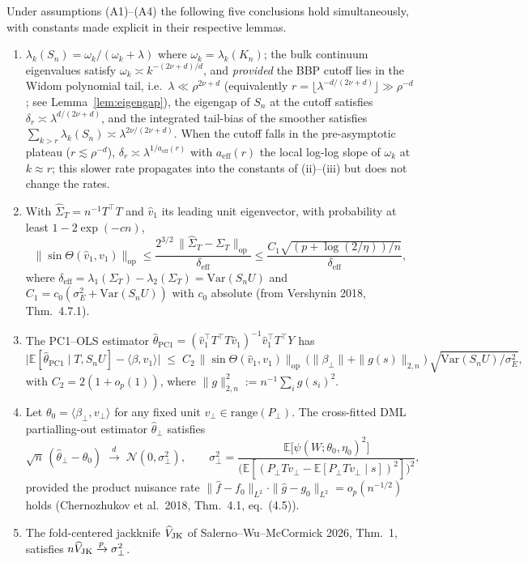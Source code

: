 \medskip
\begin{theorem}\label{thm:main}
Under assumptions (A1)--(A4) the following five conclusions hold simultaneously,
with constants made explicit in their respective lemmas.
\begin{enumerate}
\item[\emph{(i)}] $\lambda_k(S_n)=\omega_k/(\omega_k+\lambda)$ where
   $\omega_k=\lambda_k(K_n)$; the bulk continuum eigenvalues satisfy
   $\omega_k\asymp k^{-(2\nu+d)/d}$, and \emph{provided} the BBP cutoff lies
   in the Widom polynomial tail, i.e.\ $\lambda\ll\rho^{2\nu+d}$ (equivalently
   $r=\lfloor\lambda^{-d/(2\nu+d)}\rfloor\gg\rho^{-d}$; see Lemma~\ref{lem:eigengap}),
   the eigengap of $S_n$ at the cutoff satisfies
   $\delta_r\asymp\lambda^{d/(2\nu+d)}$, and the integrated tail-bias of the
   smoother satisfies $\sum_{k>r}\lambda_k(S_n)\asymp\lambda^{2\nu/(2\nu+d)}$.
   When the cutoff falls in the pre-asymptotic plateau ($r\lesssim\rho^{-d}$),
   $\delta_r\asymp\lambda^{1/a_{\mathrm{eff}}(r)}$ with $a_{\mathrm{eff}}(r)$
   the local log-log slope of $\omega_k$ at $k\!\approx\!r$; this slower rate
   propagates into the constants of (ii)--(iii) but does not change the rates.
\item[\emph{(ii)}] With $\widehat\Sigma_T=n^{-1}T^\top T$ and $\widehat v_1$ its
   leading unit eigenvector, with probability at least $1-2\exp(-cn)$,
\[
\|\sin\Theta(\widehat v_1,v_1)\|_{\mathrm{op}}
   \le \frac{2^{3/2}\,\|\widehat\Sigma_T-\Sigma_T\|_{\mathrm{op}}}{\delta_{\mathrm{eff}}}
   \le \frac{C_1\sqrt{(p+\log(2/\eta))/n}}{\delta_{\mathrm{eff}}},
\]
where $\delta_{\mathrm{eff}}=\lambda_1(\Sigma_T)-\lambda_2(\Sigma_T)=
\mathrm{Var}(S_n U)$ and $C_1=c_0(\sigma_E^2+\mathrm{Var}(S_n U))$ with $c_0$
absolute (from Vershynin 2018, Thm.~4.7.1).
\item[\emph{(iii)}] The PC1--OLS estimator $\widehat\theta_{\mathrm{PC1}}=
   (\widehat v_1^\top T^\top T\widehat v_1)^{-1}\widehat v_1^\top T^\top Y$ has
\[
\bigl|\mathbb{E}[\widehat\theta_{\mathrm{PC1}}\mid T,S_nU]-\langle\beta,v_1\rangle\bigr|
   \;\le\; C_2\,\|\sin\Theta(\widehat v_1,v_1)\|_{\mathrm{op}}\,
   \bigl(\|\beta_\perp\|+\|g(s)\|_{2,n}\bigr)\,
   \sqrt{\mathrm{Var}(S_nU)/\sigma_E^2},
\]
with $C_2=2(1+o_p(1))$, where $\|g\|_{2,n}^2:=n^{-1}\sum_i g(s_i)^2$.
\item[\emph{(iv)}] Let $\theta_0=\langle\beta_\perp,v_\perp\rangle$ for any fixed
   unit $v_\perp\in\mathrm{range}(P_\perp)$. The cross-fitted DML partialling-out
   estimator $\widehat\theta_\perp$ satisfies
\[
\sqrt n\,(\widehat\theta_\perp-\theta_0)\;\xrightarrow{d}\;\mathcal N(0,\sigma_\perp^2),
\qquad
\sigma_\perp^2 = \frac{\mathbb{E}\bigl[\psi(W;\theta_0,\eta_0)^2\bigr]}
                {\bigl(\mathbb{E}[(P_\perp T v_\perp-\mathbb E[P_\perp T v_\perp\mid s])^2]\bigr)^{2}},
\]
provided the product nuisance rate $\|\widehat f-f_0\|_{L^2}\cdot\|\widehat g-g_0\|_{L^2}=o_p(n^{-1/2})$
holds (Chernozhukov et al.\ 2018, Thm.~4.1, eq.~(4.5)).
\item[\emph{(v)}] The fold-centered jackknife $\widehat V_{\rm JK}$ of
   Salerno--Wu--McCormick 2026, Thm.~1, satisfies $n\widehat V_{\rm JK}\xrightarrow{p}\sigma_\perp^2$.
\end{enumerate}
\end{theorem}

